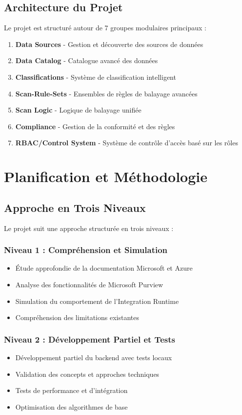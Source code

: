 \documentclass[12pt,a4paper]{article}
\begin{document}
\subsection{Architecture du Projet}
Le projet est structuré autour de 7 groupes modulaires principaux :
\begin{enumerate}
    \item \textbf{Data Sources} - Gestion et découverte des sources de données
    \item \textbf{Data Catalog} - Catalogue avancé des données
    \item \textbf{Classifications} - Système de classification intelligent
    \item \textbf{Scan-Rule-Sets} - Ensembles de règles de balayage avancées
    \item \textbf{Scan Logic} - Logique de balayage unifiée
    \item \textbf{Compliance} - Gestion de la conformité et des règles
    \item \textbf{RBAC/Control System} - Système de contrôle d'accès basé sur les rôles
\end{enumerate}

\section{Planification et Méthodologie}

\subsection{Approche en Trois Niveaux}
Le projet suit une approche structurée en trois niveaux :

\subsubsection{Niveau 1 : Compréhension et Simulation}
\begin{itemize}
    \item Étude approfondie de la documentation Microsoft et Azure
    \item Analyse des fonctionnalités de Microsoft Purview
    \item Simulation du comportement de l'Integration Runtime
    \item Compréhension des limitations existantes
\end{itemize}

\subsubsection{Niveau 2 : Développement Partiel et Tests}
\begin{itemize}
    \item Développement partiel du backend avec tests locaux
    \item Validation des concepts et approches techniques
    \item Tests de performance et d'intégration
    \item Optimisation des algorithmes de base
\end{itemize}
\end{document}
